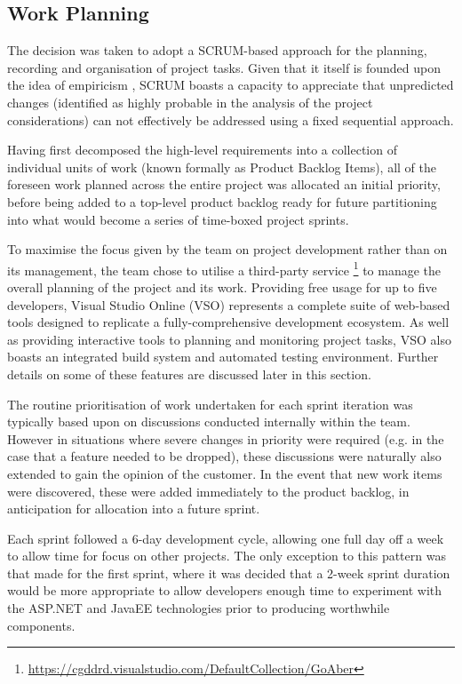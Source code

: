 \subsection{Work Planning}

The decision was taken to adopt a SCRUM-based approach for the planning, recording and organisation of project tasks. Given that it itself is founded upon the idea of empiricism \cite{scrum}, SCRUM boasts a capacity to appreciate that unpredicted changes (identified as highly probable in the analysis of the project considerations) can not effectively be addressed using a fixed sequential approach. 
 
Having first decomposed the high-level requirements into a collection of individual units of work (known formally as Product Backlog Items), all of the foreseen work planned across the entire project was allocated an initial priority, before being added to a top-level product backlog ready for future partitioning into what would become a series of time-boxed project sprints.

To maximise the focus given by the team on project development rather than on its management, the team chose to utilise a third-party service \footnote{\url{https://cgddrd.visualstudio.com/DefaultCollection/GoAber}} to manage the overall planning of the project and its work. Providing free usage for up to five developers, Visual Studio Online (VSO) \cite{vso} represents a complete suite of web-based tools designed to replicate a fully-comprehensive development ecosystem. As well as providing interactive tools to planning and monitoring project tasks, VSO also boasts an integrated build system and automated testing environment. Further details on some of these features are discussed later in this section.
 
The routine prioritisation of work undertaken for each sprint iteration was typically based upon on discussions conducted internally within the team. However in situations where severe changes in priority were required (e.g. in the case that a feature needed to be dropped), these discussions were naturally also extended to gain the opinion of the customer. In the event that new work items were discovered, these were added immediately to the product backlog, in anticipation for allocation into a future sprint.

Each sprint followed a 6-day development cycle, allowing one full day off a week to allow time for focus on other projects. The only exception to this pattern was that made for the first sprint, where it was decided that a 2-week sprint duration would be more appropriate to allow developers enough time to experiment with the ASP.NET and JavaEE technologies prior to producing worthwhile components.

